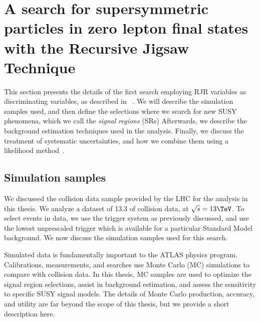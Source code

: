 

\chapter[A search for supersymmetric particles in zero lepton final states with the Recursive Jigsaw Technique][Top of Page Title]{A search for supersymmetric particles in zero lepton final states with the Recursive Jigsaw Technique}

This section presents the details of the first search employing RJR variables as discriminating variables, as described in ~\cite{ATLAS-CONF-2016-078}.
We will describe the simulation samples used, and then define the selections where we search for new SUSY phenomena, which we call the \textit{signal regions} (SRs)
Afterwards, we describe the background estimation techniques used in the analysis.
Finally, we discuss the treatment of systematic uncertainties, and how we combine them using a likelihood method~\cite{Baak:2014wma}.

\section{Simulation samples}

We discussed the collision data sample provided by the LHC for the analysis in this thesis.
We analyze a dataset of 13.3 \ifb of collision data, at $\sqrt{s} = 13 \TeV$.
To select events in data, we use the trigger system as previously discussed, and use the lowest unprescaled trigger which is available for a particular Standard Model background.
We now discuss the simulation samples used for this search.

Simulated data is fundamentally important to the ATLAS physics program.
Calibrations, measurements, and searches use Monte Carlo (MC) simulations to compare with collision data.
In this thesis, MC samples are used to optimize the signal region selections, assist in background estimation, and assess the sensitivity to specific SUSY signal models.
The details of Monte Carlo production, accuracy, and utility are far beyond the scope of this thesis, but we provide a short description here.


